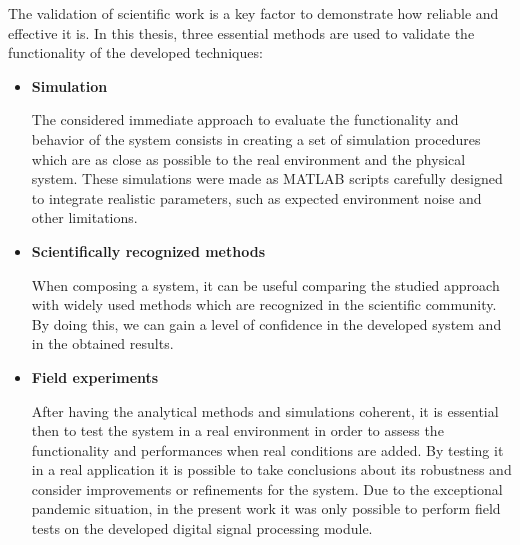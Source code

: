 The validation of scientific work is a key factor to demonstrate how reliable and effective it is. In this thesis, three essential methods are used to validate the functionality of the developed techniques:

\begin{itemize}
	
	\item \textbf{Simulation}
	
	The considered immediate approach to evaluate the functionality and behavior of the system consists in creating a set of simulation procedures which are as close as possible to the real environment and the physical system. These simulations were made as MATLAB scripts carefully designed to integrate realistic parameters, such as expected environment noise and other limitations.
	
	\item \textbf{Scientifically recognized methods}
	
	When composing a system, it can be useful comparing the studied approach with widely used methods which are recognized in the scientific community. By doing this, we can gain a level of confidence in the developed system and in the obtained results.
	
	\item \textbf{Field experiments}
	
	After having the analytical methods and simulations coherent, it is essential then to test the system in a real environment in order to assess the functionality and performances when real conditions are added. By testing it in a real application it is possible to take conclusions about its robustness and consider improvements or refinements for the system.
	Due to the exceptional pandemic situation, in the present work it was only possible to perform field tests on the developed digital signal processing module. 

\end{itemize}
